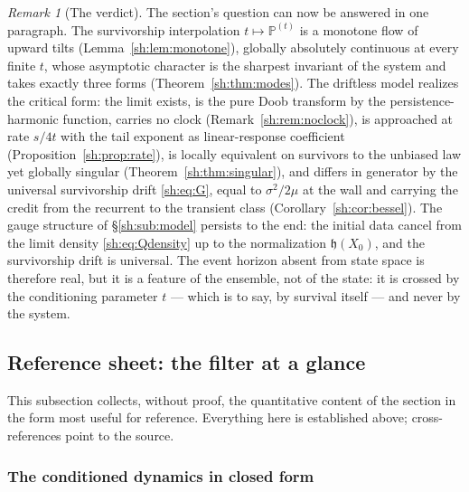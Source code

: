 \documentclass[11pt]{article}
\numberwithin{equation}{section}
\theoremstyle{plain}
\theoremstyle{definition}
\theoremstyle{remark}
\newtheorem{remark}[theorem]{Remark}
\newcommand{\PP}{\mathbb{P}}
\newcommand{\hm}{\mathfrak{h}}
\begin{document}
\begin{remark}[The verdict]\label{sh:rem:verdict}
The section's question can now be answered in one paragraph. The
survivorship interpolation $t\mapsto\PP^{(t)}$ is a monotone flow of
upward tilts (Lemma~\ref{sh:lem:monotone}), globally absolutely
continuous at every finite $t$, whose asymptotic character is the
sharpest invariant of the system and takes exactly three forms
(Theorem~\ref{sh:thm:modes}). The driftless model realizes the critical
form: the limit exists, is the pure Doob transform by the
persistence-harmonic function, carries no clock
(Remark~\ref{sh:rem:noclock}), is approached at rate $s/4t$ with the tail
exponent as linear-response coefficient
(Proposition~\ref{sh:prop:rate}), is locally equivalent on survivors to
the unbiased law yet globally singular
(Theorem~\ref{sh:thm:singular}), and differs in generator by the
universal survivorship drift \eqref{sh:eq:G}, equal to $\sigma^2/2\mu$
at the wall and carrying the credit from the recurrent to the transient
class (Corollary~\ref{sh:cor:bessel}). The gauge structure of
\S\ref{sh:sub:model} persists to the end: the initial data cancel from
the limit density \eqref{sh:eq:Qdensity} up to the normalization
$\hm(X_0)$, and the survivorship drift is universal. The event horizon
absent from state space is therefore real, but it is a feature of the
ensemble, not of the state: it is crossed by the conditioning parameter
$t$ --- which is to say, by survival itself --- and never by the system.
\end{remark}

\subsection{Reference sheet: the filter at a glance}\label{sh:sub:sheet}

This subsection collects, without proof, the quantitative content of the
section in the form most useful for reference. Everything here is
established above; cross-references point to the source.

\subsubsection{The conditioned dynamics in closed form}
\label{sh:subsub:sheet:dyn}
\end{document}
